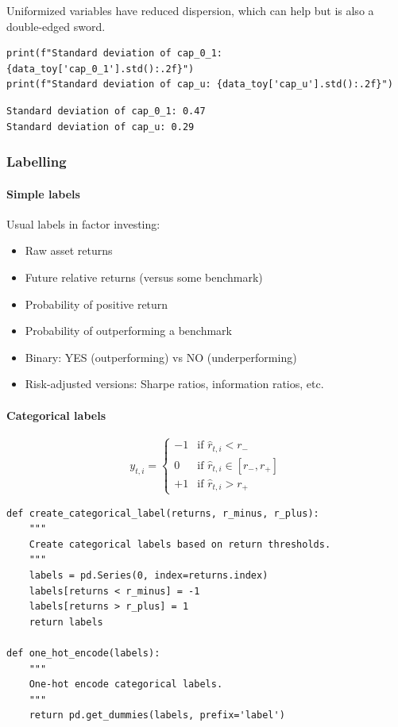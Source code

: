 Uniformized variables have reduced dispersion, which can help but is also a double-edged sword.

\begin{verbatim}
print(f"Standard deviation of cap_0_1: {data_toy['cap_0_1'].std():.2f}")
print(f"Standard deviation of cap_u: {data_toy['cap_u'].std():.2f}")
\end{verbatim}

\begin{verbatim}
Standard deviation of cap_0_1: 0.47
Standard deviation of cap_u: 0.29
\end{verbatim}

\subsubsection{Labelling}

\paragraph{Simple labels}

Usual labels in factor investing:

\begin{itemize}
\item Raw asset returns
\item Future relative returns (versus some benchmark)
\item Probability of positive return
\item Probability of outperforming a benchmark
\item Binary: YES (outperforming) vs NO (underperforming)
\item Risk-adjusted versions: Sharpe ratios, information ratios, etc.
\end{itemize}

\paragraph{Categorical labels}

\begin{equation}
y_{t,i}=\begin{cases}
-1 & \text{if } \hat{r}_{t,i} < r_- \\
0 & \text{if } \hat{r}_{t,i} \in [r_-, r_+] \\
+1 & \text{if } \hat{r}_{t,i} > r_+
\end{cases}
\end{equation}

\begin{verbatim}
def create_categorical_label(returns, r_minus, r_plus):
    """
    Create categorical labels based on return thresholds.
    """
    labels = pd.Series(0, index=returns.index)
    labels[returns < r_minus] = -1
    labels[returns > r_plus] = 1
    return labels

def one_hot_encode(labels):
    """
    One-hot encode categorical labels.
    """
    return pd.get_dummies(labels, prefix='label')
\end{verbatim}

